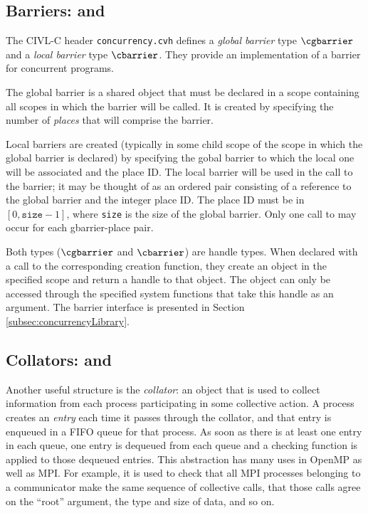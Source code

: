 \subsection{Barriers: \cgbarrier{} and \cbarrier}
\label{sec:barriers}

The CIVL-C header \texttt{concurrency.cvh} defines a \emph{global barrier} type $\cgbarrier$ and a
\emph{local barrier} type $\cbarrier$. They provide an implementation of 
a barrier for concurrent programs.

The global barrier is a shared object that must be declared in
a scope containing all scopes in which the barrier will be called.
 It is created by specifying the number of
\emph{places} that will comprise the barrier. 

Local barriers are created (typically in some child scope of the
scope in which the global barrier is declared) by specifying the
gobal barrier to which the local one will be associated and the
place ID. The local barrier will be used in the call to the barrier; 
it may be thought of as an ordered pair
consisting of a reference to the global barrier and the integer
place ID.  The place ID must be in $[0,\texttt{size}-1]$, where
\texttt{size} is the size of the global barrier.    
Only one call to \cbarriercreate{}
may occur for each gbarrier-place pair.


Both types ($\cgbarrier$ and $\cbarrier$) are handle types. When declared
with a call to the corresponding creation function, they create an
object in the specified scope and return a handle to that object. The
object can only be accessed through the specified system functions
that take this handle as an argument. The barrier interface is presented in Section \ref{subsec:concurrencyLibrary}.

\subsection{Collators: \cgcollator{} and \ccollator}
\label{sec:collators}
Another useful structure is the \emph{collator}: an object that is
used to collect information from each process participating in some
collective action.  A process creates an \emph{entry} each time it
passes through the collator, and that entry is enqueued in a FIFO
queue for that process.  As soon as there is at least one entry in
each queue, one entry is dequeued from each queue and a checking
function is applied to those dequeued entries.  This abstraction has
many uses in OpenMP as well as MPI.  For example, it is used to check
that all MPI processes belonging to a communicator make the same
sequence of collective calls, that those calls agree on the ``root''
argument, the type and size of data, and so on.


